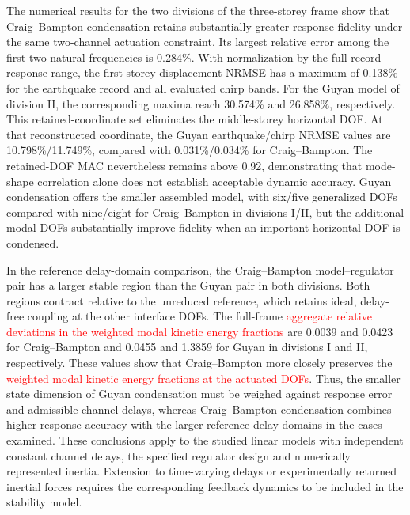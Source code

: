 \documentclass[a4paper,fleqn,review,12pt]{cas-sc}
\newcommand{\rev}[1]{\textcolor{red}{#1}}
\begin{document}
The numerical results for the two divisions of the three-storey frame show that Craig--Bampton condensation retains substantially greater response fidelity under the same two-channel actuation constraint. Its largest relative error among the first two natural frequencies is 0.284\%. With normalization by the full-record response range, the first-storey displacement NRMSE has a maximum of 0.138\% for the earthquake record and all evaluated chirp bands. For the Guyan model of division II, the corresponding maxima reach 30.574\% and 26.858\%, respectively. This retained-coordinate set eliminates the middle-storey horizontal DOF. At that reconstructed coordinate, the Guyan earthquake/chirp NRMSE values are 10.798\%/11.749\%, compared with 0.031\%/0.034\% for Craig--Bampton. The retained-DOF MAC nevertheless remains above 0.92, demonstrating that mode-shape correlation alone does not establish acceptable dynamic accuracy. Guyan condensation offers the smaller assembled model, with six/five generalized DOFs compared with nine/eight for Craig--Bampton in divisions I/II, but the additional modal DOFs substantially improve fidelity when an important horizontal DOF is condensed.

In the reference delay-domain comparison, the Craig--Bampton model--regulator pair has a larger stable region than the Guyan pair in both divisions. Both regions contract relative to the unreduced reference, which retains ideal, delay-free coupling at the other interface DOFs. The full-frame \rev{aggregate relative deviations in the weighted modal kinetic energy fractions} are 0.0039 and 0.0423 for Craig--Bampton and 0.0455 and 1.3859 for Guyan in divisions I and II, respectively. These values show that Craig--Bampton more closely preserves the \rev{weighted modal kinetic energy fractions at the actuated DOFs}. Thus, the smaller state dimension of Guyan condensation must be weighed against response error and admissible channel delays, whereas Craig--Bampton condensation combines higher response accuracy with the larger reference delay domains in the cases examined. These conclusions apply to the studied linear models with independent constant channel delays, the specified regulator design and numerically represented inertia. Extension to time-varying delays or experimentally returned inertial forces requires the corresponding feedback dynamics to be included in the stability model.


\FloatBarrier


\end{document}
